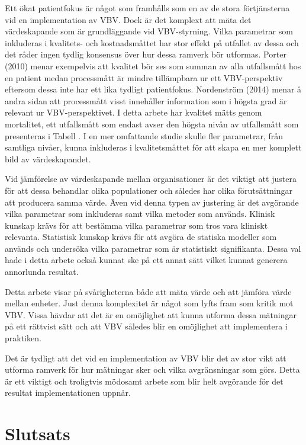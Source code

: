 Ett ökat patientfokus är något som framhålls som en av de stora förtjänsterna vid en implementation av VBV. Dock är det komplext att mäta det värdeskapande som är grundläggande vid VBV-styrning. Vilka parametrar som inkluderas i kvalitets- och kostnadsmåttet har stor effekt på utfallet av dessa och det råder ingen tydlig konsensus över hur dessa ramverk bör utformas. Porter (2010) menar exempelvis att kvalitet bör ses som summan av alla utfallsmått hos en patient medan processmått är mindre tillämpbara ur ett VBV-perspektiv eftersom dessa inte har ett lika tydligt patientfokus. Nordenström (2014) menar å andra sidan att processmått visst innehåller information som i högsta grad är relevant ur VBV-perspektivet. I detta arbete har kvalitet mätts genom mortalitet, ett utfallsmått som endast avser den högsta nivån av utfallsmått som presenteras i Tabell \label{tab:livslangd}. I en mer omfattande studie skulle fler parametrar, från samtliga nivåer, kunna inkluderas i kvalitetsmåttet för att skapa en mer komplett bild av värdeskapandet.

Vid jämförelse av värdeskapande mellan organisationer är det viktigt att justera för att dessa behandlar olika populationer och således har olika förutsättningar att producera samma värde. Även vid denna typen av justering är det avgörande vilka parametrar som inkluderas samt vilka metoder som används. Klinisk kunskap krävs för att bestämma vilka parametrar som tros vara kliniskt relevanta. Statistisk kunskap krävs för att avgöra de statiska modeller som används och undersöka vilka parametrar som är statistiskt signifikanta. Dessa val hade i detta arbete också kunnat ske på ett annat sätt vilket kunnat generera annorlunda resultat.

Detta arbete visar på svårigheterna både att mäta värde och att jämföra värde mellan enheter. Just denna komplexitet är något som lyfts fram som kritik mot VBV. Vissa hävdar att det är en omöjlighet att kunna utforma dessa mätningar på ett rättvist sätt och att VBV således blir en omöjlighet att implementera i praktiken.

Det är tydligt att det vid en implementation av VBV blir det av stor vikt att utforma ramverk för hur mätningar sker och vilka avgränsningar som görs. Detta är ett viktigt och troligtvis mödosamt arbete som blir helt avgörande för det resultat implementationen uppnår.


\section{Slutsats}

